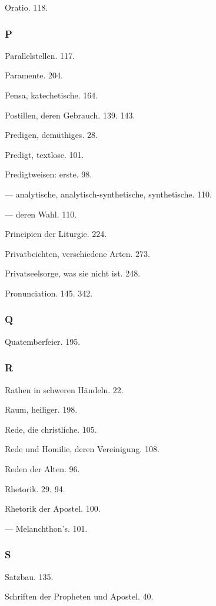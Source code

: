 Oratio. 118.

\subsubsection{P}

Parallelstellen. 117.

Paramente. 204.

Pensa, katechetische. 164.

Postillen, deren Gebrauch. 139. 143.

Predigen, demüthiges. 28.

Predigt, textlose. 101.

Predigtweisen: erste. 98.

— analytische, analytisch-synthetische, synthetische. 110.

— deren Wahl. 110.

Principien der Liturgie. 224.

Privatbeichten, verschiedene Arten. 273.

Privatseelsorge, was sie nicht ist. 248.

Pronunciation. 145. 342.

\subsubsection{Q}

Quatemberfeier. 195.

\subsubsection{R}

Rathen in schweren Händeln. 22.

Raum, heiliger. 198.

Rede, die christliche. 105.

Rede und Homilie, deren Vereinigung. 108.

Reden der Alten. 96.

Rhetorik. 29. 94.

Rhetorik der Apostel. 100.

— Melanchthon’s. 101.

\subsubsection{S}

Satzbau. 135.

Schriften der Propheten und Apostel. 40.

